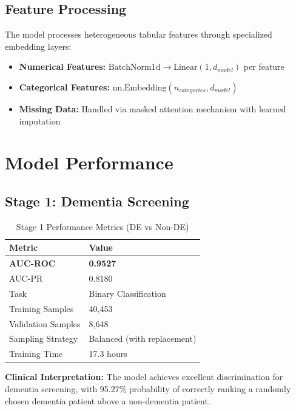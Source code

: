 \documentclass[11pt,a4paper]{article}
\begin{document}
\subsection{Feature Processing}

The model processes heterogeneous tabular features through specialized embedding layers:

\begin{itemize}
    \item \textbf{Numerical Features:} $\text{BatchNorm1d} \rightarrow \text{Linear}(1, d_{model})$ per feature
    \item \textbf{Categorical Features:} $\text{nn.Embedding}(n_{categories}, d_{model})$
    \item \textbf{Missing Data:} Handled via masked attention mechanism with learned imputation
\end{itemize}

\section{Model Performance}

\subsection{Stage 1: Dementia Screening}

\begin{table}[H]
\centering
\caption{Stage 1 Performance Metrics (DE vs Non-DE)}
\label{tab:stage1}
\begin{tabular}{@{}ll@{}}
\toprule
\textbf{Metric} & \textbf{Value} \\
\midrule
\textbf{AUC-ROC} & \textbf{0.9527} \\
AUC-PR & 0.8180 \\
Task & Binary Classification \\
Training Samples & 40,453 \\
Validation Samples & 8,648 \\
Sampling Strategy & Balanced (with replacement) \\
Training Time & 17.3 hours \\
\bottomrule
\end{tabular}
\end{table}

\textbf{Clinical Interpretation:} The model achieves excellent discrimination for dementia screening, with 95.27\% probability of correctly ranking a randomly chosen dementia patient above a non-dementia patient.
\end{document}
